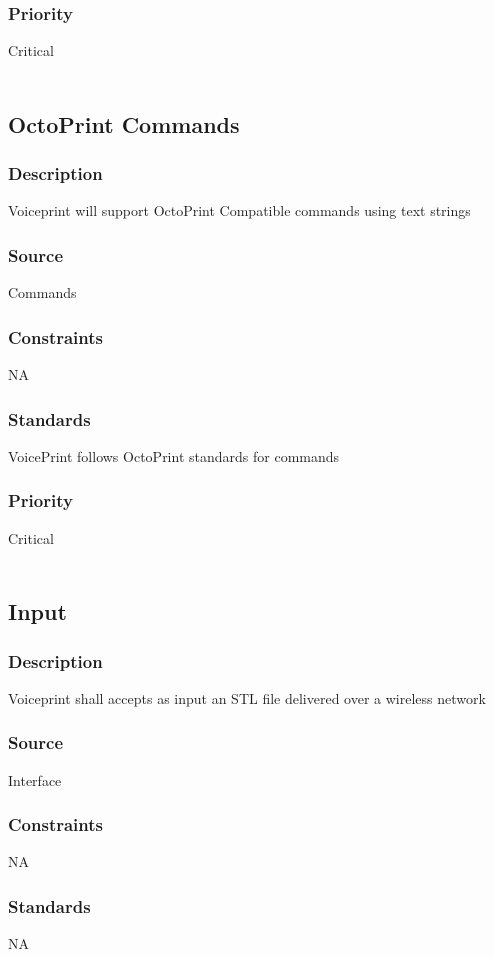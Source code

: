 \subsubsection{Priority}
Critical \\
\\
\subsection{OctoPrint Commands}
\subsubsection{Description}
Voiceprint will support OctoPrint Compatible commands using text strings
\subsubsection{Source}
Commands
\subsubsection{Constraints}
NA
\subsubsection{Standards}
VoicePrint follows OctoPrint standards for commands
\subsubsection{Priority}
Critical \\
\\
\subsection{Input}
\subsubsection{Description}
Voiceprint shall accepts as input an STL file delivered over a wireless network
\subsubsection{Source}
Interface
\subsubsection{Constraints}
NA
\subsubsection{Standards}
NA
